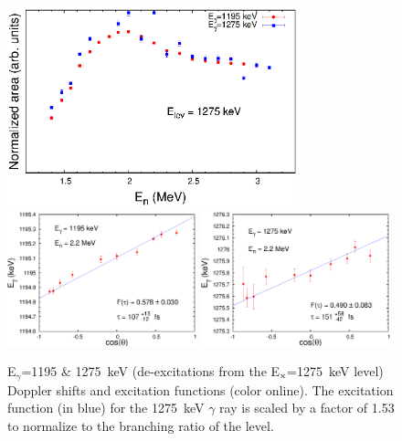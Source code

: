 \begin{figure}[h]
\begin{center}
\includegraphics[width=0.75\textwidth]{1195_ExF.eps}\\
\includegraphics[width=0.49\textwidth]{1195_DSAM.eps}
\includegraphics[width=0.49\textwidth]{1275_DSAM.eps}

\caption{E$_\gamma$=1195 \& 1275~keV (de-excitations from the E$_{\rm x}$=1275~keV level) Doppler shifts and excitation functions (color online). The excitation function (in blue) for the 1275~keV $\gamma$ ray is scaled by a factor of 1.53 to normalize to the branching ratio of the level. \label{fig:1275_DSAM_EXF}}
\end{center}
\end{figure}

